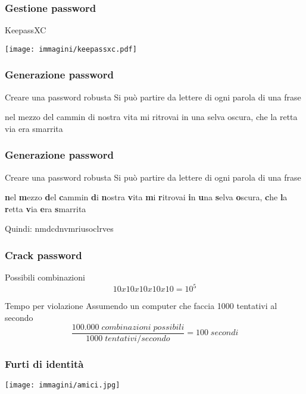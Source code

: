 \documentclass[italian,aspectratio=169]{beamer}
\begin{document}
\begin{frame}
 \frametitle{Gestione password}
 \centering \huge KeepassXC
  \begin{center}
   \texttt{[image: immagini/keepassxc.pdf]}
  \end{center}
\end{frame}

\begin{frame}
 \frametitle{Generazione password}
 \begin{block}{Creare una password robusta}
  Si può partire da lettere di ogni parola di una frase
 \end{block}
 \pause
 nel mezzo del cammin di nostra vita mi ritrovai in una selva oscura, che la retta via
 era smarrita
\end{frame}

\begin{frame}
 \frametitle{Generazione password}
 \begin{block}{Creare una password robusta}
  Si può partire da lettere di ogni parola di una frase
 \end{block}
 \textbf{n}el \textbf{m}ezzo \textbf{d}el \textbf{c}ammin \textbf{d}i \textbf{n}ostra
 \textbf{v}ita \textbf{m}i \textbf{r}itrovai \textbf{i}n \textbf{u}na \textbf{s}elva
 \textbf{o}scura, \textbf{c}he \textbf{l}a \textbf{r}etta \textbf{v}ia \textbf{e}ra \textbf{s}marrita
 \begin{center}
  \huge Quindi: nmdcdnvmriusoclrves 
 \end{center}
\end{frame}

\begin{frame}
 \frametitle{Crack password}
 \begin{block}{Possibili combinazioni}
   \begin{equation*}
   10x10x10x10x10=10^{5}
   \end{equation*}
 \end{block}
  \begin{block}{Tempo per violazione}
  Assumendo un computer che faccia 1000 tentativi al secondo
   \begin{equation*}
   \frac{100.000\;combinazioni\;possibili}{1000\;tentativi/secondo}=100\;secondi
   \end{equation*}
 \end{block}
\end{frame}

\begin{frame}
 \frametitle{Furti di identità}
 \vspace{-0.5cm}
 \begin{center}
  \texttt{[image: immagini/amici.jpg]}
 \end{center}

\end{frame}
\end{document}
